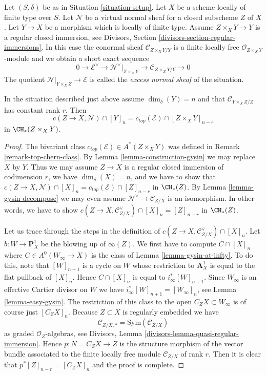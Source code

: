 \noindent
Let $(S, \delta)$ be as in Situation \ref{situation-setup}. Let $X$ be a scheme
locally of finite type over $S$. Let $\mathcal{N}$ be a virtual normal
sheaf for a closed subscheme $Z$ of $X$. Let $Y \to X$ be a morphism
which is locally of finite type. Assume $Z \times_X Y \to Y$ is a
regular closed immersion, see
Divisors, Section \ref{divisors-section-regular-immersions}.
In this case the conormal sheaf $\mathcal{C}_{Z \times_X Y/Y}$ is a finite
locally free $\mathcal{O}_{Z \times_X Y}$-module and we obtain a short
exact sequence
$$
0 \to \mathcal{E}^\vee \to
\mathcal{N}^\vee|_{Z \times_X Y} \to \mathcal{C}_{Z \times_X Y/Y} \to 0
$$
The quotient $\mathcal{N}|_{Y \times_X Z} \to \mathcal{E}$ is called the
{\it excess normal sheaf} of the situation.

\begin{lemma}
\label{lemma-gysin-fundamental}
In the situation described just above assume $\dim_\delta(Y) = n$
and that $\mathcal{C}_{Y \times_X Z/Z}$ has constant rank $r$.
Then
$$
c(Z \to X, \mathcal{N}) \cap [Y]_n =
c_{top}(\mathcal{E}) \cap [Z \times_X Y]_{n - r}
$$
in $\CH_*(Z \times_X Y)$.
\end{lemma}

\begin{proof}
The bivariant class $c_{top}(\mathcal{E}) \in A^*(Z \times_X Y)$ was
defined in Remark \ref{remark-top-chern-class}.
By Lemma \ref{lemma-construction-gysin} we may replace $X$ by $Y$.
Thus we may assume $Z \to X$ is a regular closed immersion
of codimension $r$, we have $\dim_\delta(X) = n$, and we have
to show that $c(Z \to X, \mathcal{N}) \cap [X]_n =
c_{top}(\mathcal{E}) \cap [Z]_{n - r}$ in $\CH_*(Z)$.
By Lemma \ref{lemma-gysin-decompose} we may even assume
$\mathcal{N}^\vee \to \mathcal{C}_{Z/X}$ is an isomorphism.
In other words, we have to show
$c(Z \to X, \mathcal{C}_{Z/X}^\vee) \cap [X]_n = [Z]_{n - r}$ in $\CH_*(Z)$.

\medskip\noindent
Let us trace through the steps in the definition of
$c(Z \to X, \mathcal{C}_{Z/X}^\vee) \cap [X]_n$. Let
$b : W \to \mathbf{P}^1_X$
be the blowing up of $\infty(Z)$. We first have to compute
$C \cap [X]_n$ where $C \in A^0(W_\infty \to X)$ is
the class of Lemma \ref{lemma-gysin-at-infty}.
To do this, note that $[W]_{n + 1}$
is a cycle on $W$ whose restriction to $\mathbf{A}^1_X$ is
equal to the flat pullback of $[X]_n$. Hence $C \cap [X]_n$
is equal to $i_\infty^*[W]_{n + 1}$. Since $W_\infty$ is an
effective Cartier divisor on $W$ we have
$i_\infty^*[W]_{n + 1} = [W_\infty]_n$, see Lemma \ref{lemma-easy-gysin}.
The restriction of this class to the open $C_ZX \subset W_\infty$
is of course just $[C_ZX]_n$. Because $Z \subset X$ is regularly
embedded we have
$$
\mathcal{C}_{Z/X, *} = \text{Sym}(\mathcal{C}_{Z/X})
$$
as graded $\mathcal{O}_Z$-algebras, see
Divisors, Lemma \ref{divisors-lemma-quasi-regular-immersion}.
Hence $p : N = C_ZX \to Z$ is the structure morphism of the
vector bundle associated to the finite locally free module
$\mathcal{C}_{Z/X}$ of rank $r$. Then it is clear that
$p^*[Z]_{n - r} = [C_ZX]_n$ and the proof is complete.
\end{proof}

